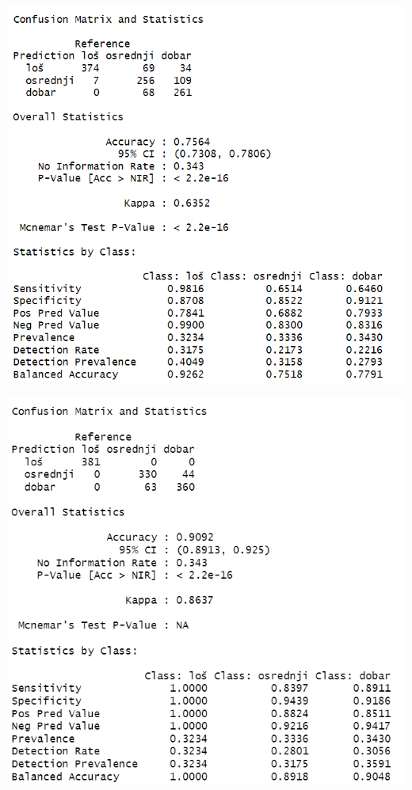 \begin{center}
	\includegraphics{../figures/expl/005.png}
\end{center}

\begin{center}
	\includegraphics{../figures/expl/006.png}
\end{center}

